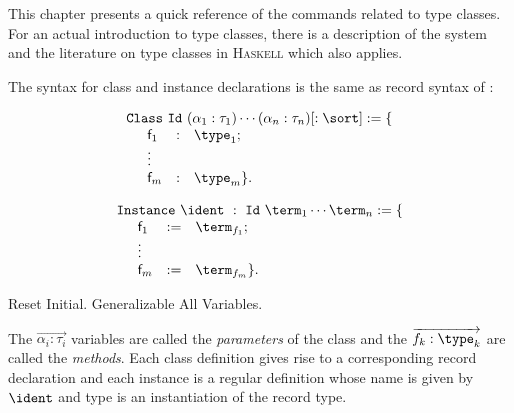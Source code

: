 \def\Haskell{\textsc{Haskell}\xspace}
\def\eol{\setlength\parskip{0pt}\par}
\def\indent#1{\noindent\kern#1}
\def\cst#1{\textsf{#1}}

\newcommand\tele[1]{\overrightarrow{#1}}

\label{typeclasses}

This chapter presents a quick reference of the commands related to type
classes. For an actual introduction to type classes, there is a
description of the system \cite{sozeau08} and the literature on type
classes in \Haskell which also applies.

\label{ClassesInstances}

The syntax for class and instance declarations is the same as
record syntax of \Coq:
\def\kw{\texttt}
\def\classid{\texttt}

\begin{center}
\[\begin{array}{l}
\kw{Class}~\classid{Id}~(\alpha_1 : \tau_1) \cdots (\alpha_n : \tau_n) 
[: \sort] := \{\\
\begin{array}{p{0em}lcl}
  & \cst{f}_1 & : & \type_1 ; \\
  & \vdots & &  \\
  & \cst{f}_m & : & \type_m \}.
\end{array}\end{array}\]
\end{center}
\begin{center}
\[\begin{array}{l}
\kw{Instance}~\ident~:~\classid{Id}~\term_1 \cdots \term_n := \{\\
\begin{array}{p{0em}lcl}
  & \cst{f}_1 & := & \term_{f_1} ; \\
  & \vdots & &  \\
  & \cst{f}_m & := & \term_{f_m} \}.
\end{array}\end{array}\]
\end{center}
\begin{coq_eval}
  Reset Initial.
  Generalizable All Variables.
\end{coq_eval}

The $\tele{\alpha_i : \tau_i}$ variables are called the \emph{parameters}
of the class and the $\tele{f_k : \type_k}$ are called the
\emph{methods}. Each class definition gives rise to a corresponding
record declaration and each instance is a regular definition whose name
is given by $\ident$ and type is an instantiation of the record type.

